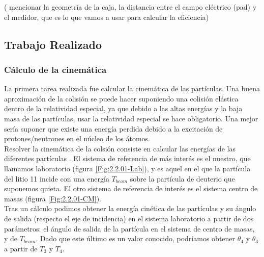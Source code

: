 \documentclass[12pt,a4paper]{article}
\numberwithin{equation}{section}
\numberwithin{figure}{section}
\begin{document}
({\color{red} mencionar la geometría de la caja, la distancia entre el campo eléctrico (pad) y el medidor, que es lo que vamos a usar para calcular la eficiencia}) \\


\subsection{Trabajo Realizado}

\subsubsection{Cálculo de la cinemática}

La primera tarea realizada fue calcular la cinemática de las partículas. Una buena aproximación de la colisión se puede hacer suponiendo una colisión elástica dentro de la relatividad especial, ya que debido a las altas energías y la baja masa de las partículas, usar la relatividad especial se hace obligatorio. Una mejor sería suponer que existe una energía perdida debido a la excitación de protones/neutrones en el núcleo de los átomos.  \\

Resolver la cinemática de la colsión consiste en calcular las energías de las diferentes partículas . El sistema de referencia de más interés es el nuestro, que llamamos laboratorio (figura \ref{Fig:2.2.01-Lab}), y es aquel en el que la partícula del litio 11 incide con una energía $T_{beam}$ sobre la partícula de deuterio que suponemos quieta. El otro sistema de referencia de interés es el sistema centro de masas (figura \ref{Fig:2.2.01-CM}). \\

Tras un cálculo podimos obtener la energía cinética de las partículas y su ángulo de salida (respecto el eje de incidencia) en el sistema laboratorio a partir de dos parámetros: el ángulo de salida de la partícula en el sistema de centro de masas, y de $T_{beam}$. Dado que este último es un valor conocido, podríamos obtener $\theta_4$ y $\theta_3$ a partir de $T_3$ y $T_4$.   \\
\end{document}
